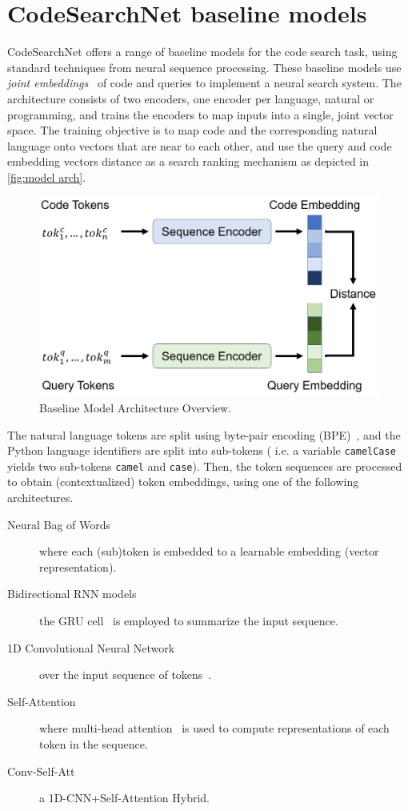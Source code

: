 \documentclass{article}
\begin{document}
\section{CodeSearchNet baseline models}

CodeSearchNet offers a range of baseline models for the code search task, using standard techniques from neural sequence processing. These baseline models use
\emph{joint embeddings}~\cite{gu2018deep,mitra2018introduction} of code and queries to implement a neural search
system. The architecture consists of two encoders, one encoder per language, natural or programming, and trains the encoders to map inputs into a single, joint vector
space.
The training objective is to map code and the corresponding natural language onto vectors that are near to each other, and use the query and code embedding vectors distance as a search ranking mechanism\cite{1909.09436} as depicted in \autoref{fig:model arch}.

\begin{figure}[t]
    \includegraphics[width=\columnwidth]{ModelArchOverview.png}
    \caption{\label{fig:model arch}Baseline Model Architecture Overview\cite{1909.09436}.}
\end{figure}

The natural language tokens are split using byte-pair encoding (BPE)~\cite{gage1994new,sennrich2016neural}, and the Python language identifiers are split into sub-tokens ( i.e. a variable \texttt{camelCase} yields two sub-tokens \texttt{camel} and \texttt{case}). Then, the token sequences are processed to obtain (contextualized) token embeddings, using one of the following architectures.
\begin{description}
    \item[Neural Bag of Words] where each (sub)token is
      embedded to a learnable embedding (vector
      representation).
    \item[Bidirectional RNN models] the GRU cell~\cite{cho2014properties} is employed to summarize the input sequence.
    \item[1D Convolutional Neural Network] over the
      input sequence of tokens~\cite{kim2014convolutional}.
    \item[Self-Attention] where multi-head attention~\cite{vaswani2017attention}
      is used to compute representations of each token
      in the sequence.
    \item[Conv-Self-Att] a 1D-CNN+Self-Attention Hybrid.
\end{description}
\end{document}
